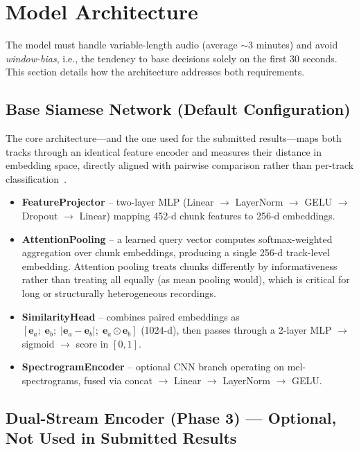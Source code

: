 \documentclass[11pt,a4paper]{article}
\begin{document}
\section{Model Architecture}
\label{sec:model}

The model must handle variable-length audio (average $\sim$3 minutes) and avoid \emph{window-bias}, i.e., the tendency to base decisions solely on the first 30 seconds. This section details how the architecture addresses both requirements.

\subsection{Base Siamese Network (Default Configuration)}

The core architecture---and the one used for the submitted results---maps both tracks through an identical feature encoder and measures their distance in embedding space, directly aligned with pairwise comparison rather than per-track classification~\cite{B4}.

\begin{itemize}[nosep]
  \item \textbf{FeatureProjector} -- two-layer MLP (Linear $\to$ LayerNorm $\to$ GELU $\to$ Dropout $\to$ Linear) mapping 452-d chunk features to 256-d embeddings.
  \item \textbf{AttentionPooling} -- a learned query vector computes softmax-weighted aggregation over chunk embeddings, producing a single 256-d track-level embedding. Attention pooling treats chunks differently by informativeness rather than treating all equally (as mean pooling would), which is critical for long or structurally heterogeneous recordings.
  \item \textbf{SimilarityHead} -- combines paired embeddings as $[\mathbf{e}_a;\; \mathbf{e}_b;\; |\mathbf{e}_a - \mathbf{e}_b|;\; \mathbf{e}_a \odot \mathbf{e}_b]$ (1024-d), then passes through a 2-layer MLP $\to$ sigmoid $\to$ score in $[0, 1]$.
  \item \textbf{SpectrogramEncoder} -- optional CNN branch operating on mel-spectrograms, fused via concat $\to$ Linear $\to$ LayerNorm $\to$ GELU.
\end{itemize}

\subsection{Dual-Stream Encoder (Phase 3) --- Optional, Not Used in Submitted Results}
\end{document}

